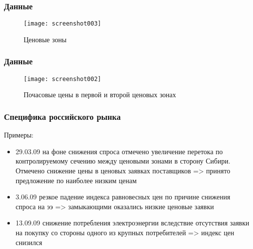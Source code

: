 \documentclass[c, dvipsnames]{beamer}  %
\begin{document}
\begin{frame}[shrink=5]
\frametitle{Данные} 





\begin{figure}
	\centering
	\texttt{[image: screenshot003]}
	\caption{ Ценовые зоны  }
	\label{fig:screenshot003}
\end{figure}

\end{frame}





\begin{frame}[shrink=5]
\frametitle{Данные} 





\begin{figure}
	\centering
	\texttt{[image: screenshot002]}
	\caption{ Почасовые цены в первой и второй ценовых зонах }
	\label{fig:screenshot002}
\end{figure}

\end{frame}

\begin{frame}[shrink=5]
\frametitle{Специфика российского рынка} 

Примеры:

\begin{itemize}
	\item 29.03.09 на  фоне снижения спроса отмечено увеличение перетока по контролируемому сечению между ценовыми зонами в сторону Сибири. Отмечено снижение цены в ценовых заявках поставщиков  => принято предложение по наиболее низким ценам 
	\item   3.06.09 резкое падение индекса равновесных цен по причине снижения спроса на ээ => замыкающими оказались низкие ценовые заявки 
	\item  13.09.09 снижение потребления электроэнергии вследствие отсутствия заявки на покупку со стороны одного из крупных потребителей => индекс цен снизился
	
\end{itemize}


\end{frame}
\end{document}
